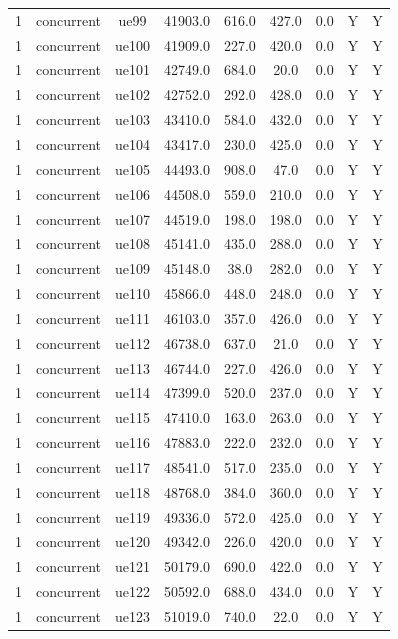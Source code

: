 \begin{table}[ht]
\begin{tabular}{|c|c|c|c|c|c|c|c|c|}
1 & concurrent & ue99 & 41903.0 & 616.0 & 427.0 & 0.0 & Y & Y \\
1 & concurrent & ue100 & 41909.0 & 227.0 & 420.0 & 0.0 & Y & Y \\
1 & concurrent & ue101 & 42749.0 & 684.0 & 20.0 & 0.0 & Y & Y \\
1 & concurrent & ue102 & 42752.0 & 292.0 & 428.0 & 0.0 & Y & Y \\
1 & concurrent & ue103 & 43410.0 & 584.0 & 432.0 & 0.0 & Y & Y \\
1 & concurrent & ue104 & 43417.0 & 230.0 & 425.0 & 0.0 & Y & Y \\
1 & concurrent & ue105 & 44493.0 & 908.0 & 47.0 & 0.0 & Y & Y \\
1 & concurrent & ue106 & 44508.0 & 559.0 & 210.0 & 0.0 & Y & Y \\
1 & concurrent & ue107 & 44519.0 & 198.0 & 198.0 & 0.0 & Y & Y \\
1 & concurrent & ue108 & 45141.0 & 435.0 & 288.0 & 0.0 & Y & Y \\
1 & concurrent & ue109 & 45148.0 & 38.0 & 282.0 & 0.0 & Y & Y \\
1 & concurrent & ue110 & 45866.0 & 448.0 & 248.0 & 0.0 & Y & Y \\
1 & concurrent & ue111 & 46103.0 & 357.0 & 426.0 & 0.0 & Y & Y \\
1 & concurrent & ue112 & 46738.0 & 637.0 & 21.0 & 0.0 & Y & Y \\
1 & concurrent & ue113 & 46744.0 & 227.0 & 426.0 & 0.0 & Y & Y \\
1 & concurrent & ue114 & 47399.0 & 520.0 & 237.0 & 0.0 & Y & Y \\
1 & concurrent & ue115 & 47410.0 & 163.0 & 263.0 & 0.0 & Y & Y \\
1 & concurrent & ue116 & 47883.0 & 222.0 & 232.0 & 0.0 & Y & Y \\
1 & concurrent & ue117 & 48541.0 & 517.0 & 235.0 & 0.0 & Y & Y \\
1 & concurrent & ue118 & 48768.0 & 384.0 & 360.0 & 0.0 & Y & Y \\
1 & concurrent & ue119 & 49336.0 & 572.0 & 425.0 & 0.0 & Y & Y \\
1 & concurrent & ue120 & 49342.0 & 226.0 & 420.0 & 0.0 & Y & Y \\
1 & concurrent & ue121 & 50179.0 & 690.0 & 422.0 & 0.0 & Y & Y \\
1 & concurrent & ue122 & 50592.0 & 688.0 & 434.0 & 0.0 & Y & Y \\
1 & concurrent & ue123 & 51019.0 & 740.0 & 22.0 & 0.0 & Y & Y \\

\end{tabular}
\end{table}
